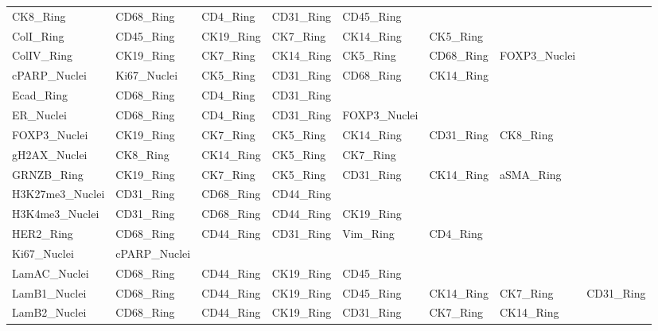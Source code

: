 \documentclass[preprint,review,3p,12pt]{elsarticle}
\begin{document}
\begin{supptable}[p]
{\begin{tabular}{l | l l l l l l l}
CK8\_Ring     & CD68\_Ring    & CD4\_Ring     & CD31\_Ring  & CD45\_Ring    &               &               &               \\
ColI\_Ring    & CD45\_Ring    & CK19\_Ring    & CK7\_Ring   & CK14\_Ring    & CK5\_Ring     &               &               \\
ColIV\_Ring   & CK19\_Ring    & CK7\_Ring     & CK14\_Ring  & CK5\_Ring     & CD68\_Ring    & FOXP3\_Nuclei \\
cPARP\_Nuclei & Ki67\_Nuclei  & CK5\_Ring     & CD31\_Ring  & CD68\_Ring    & CK14\_Ring    &               &               \\
Ecad\_Ring    & CD68\_Ring    & CD4\_Ring     & CD31\_Ring  &               &               &               &               \\
ER\_Nuclei    & CD68\_Ring    & CD4\_Ring     & CD31\_Ring  & FOXP3\_Nuclei &               &               &               \\
FOXP3\_Nuclei & CK19\_Ring    & CK7\_Ring     & CK5\_Ring   & CK14\_Ring    & CD31\_Ring    & CK8\_Ring     &               \\
gH2AX\_Nuclei & CK8\_Ring     & CK14\_Ring    & CK5\_Ring   & CK7\_Ring     &               &               &               \\
GRNZB\_Ring   & CK19\_Ring    & CK7\_Ring     & CK5\_Ring   & CD31\_Ring    & CK14\_Ring    & aSMA\_Ring    &               \\
H3K27me3\_Nuclei & CD31\_Ring    & CD68\_Ring    & CD44\_Ring  &               &               &               &               \\
H3K4me3\_Nuclei  & CD31\_Ring    & CD68\_Ring    & CD44\_Ring  & CK19\_Ring    &               &               &               \\
HER2\_Ring    & CD68\_Ring    & CD44\_Ring    & CD31\_Ring  & Vim\_Ring     & CD4\_Ring     &               &               \\
Ki67\_Nuclei  & cPARP\_Nuclei &               &             &               &               &               &               \\
LamA\/C\_Nuclei & CD68\_Ring    & CD44\_Ring    & CK19\_Ring  & CD45\_Ring    &               &               &               \\
LamB1\_Nuclei & CD68\_Ring    & CD44\_Ring    & CK19\_Ring  & CD45\_Ring    & CK14\_Ring    & CK7\_Ring     & CD31\_Ring    \\
LamB2\_Nuclei & CD68\_Ring    & CD44\_Ring    & CK19\_Ring  & CD31\_Ring    & CK7\_Ring     & CK14\_Ring    &               \\

\end{tabular}}
\end{supptable}
\end{document}
